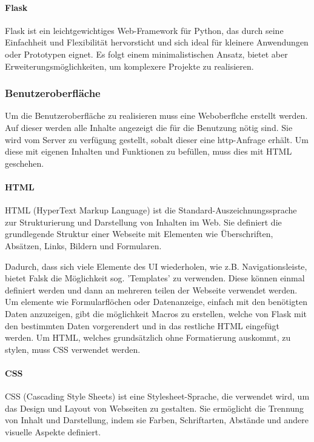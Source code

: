 \paragraph{Flask}
Flask ist ein leichtgewichtiges Web-Framework für Python, das durch seine Einfachheit und Flexibilität hervorsticht und sich ideal für kleinere Anwendungen oder Prototypen eignet. Es folgt einem minimalistischen Ansatz, bietet aber Erweiterungsmöglichkeiten, um komplexere Projekte zu realisieren. \cite{flask_wp}

\subsubsection{Benutzeroberfläche}

Um die Benutzeroberfläche zu realisieren muss eine Weboberflche erstellt werden. Auf dieser werden alle Inhalte angezeigt die für die Benutzung nötig sind. Sie wird vom Server zu verfügung gestellt, sobalt dieser eine http-Anfrage erhält. Um diese mit eigenen Inhalten und Funktionen zu befüllen, muss dies mit HTML geschehen.

\paragraph{HTML}

HTML (HyperText Markup Language) ist die Standard-Auszeichnungssprache zur Strukturierung und Darstellung von Inhalten im Web. Sie definiert die grundlegende Struktur einer Webseite mit Elementen wie Überschriften, Absätzen, Links, Bildern und Formularen. \cite{html_wp}

Dadurch, dass sich viele Elemente des UI wiederholen, wie z.B. Navigationsleiste, bietet Falsk die Möglichkeit sog. 'Templates' zu verwenden. Diese können einmal definiert werden und dann an mehreren teilen der Webseite verwendet werden.
Um elemente wie Formularflöchen oder Datenanzeige, einfach mit den benötigten Daten anzuzeigen, gibt die möglichkeit Macros zu erstellen, welche von Flask mit den bestimmten Daten vorgerendert und in das restliche HTML eingefügt werden.
Um HTML, welches grundsätzlich ohne Formatierung auskommt, zu stylen, muss CSS verwendet werden. 

\paragraph{CSS}
CSS (Cascading Style Sheets) ist eine Stylesheet-Sprache, die verwendet wird, um das Design und Layout von Webseiten zu gestalten. Sie ermöglicht die Trennung von Inhalt und Darstellung, indem sie Farben, Schriftarten, Abstände und andere visuelle Aspekte definiert.

